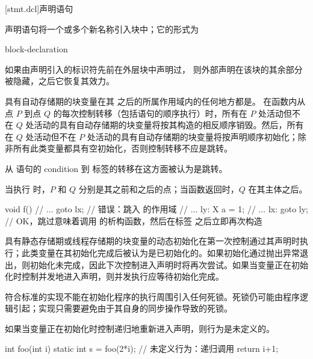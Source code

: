 [stmt.dcl]{声明语句}%

\pnum
声明语句将一个或多个新名称引入块中；它的形式为
\begin{bnf}
\br
    block-declaration
\end{bnf}
\begin{note}
如果由声明引入的标识符先前在外层块中声明过，
%
%
%
则外部声明在该块的其余部分被隐藏，之后它恢复其效力。
\end{note}

\pnum
{}%
%
%
具有自动存储期的块变量在其  之后的所属作用域内的任何地方都是。
%
%
在函数内从点 $P$ 到点 $Q$ 的每次控制转移（包括语句的顺序执行）时，所有在 $P$ 处活动但不在 $Q$ 处活动的具有自动存储期的块变量将按其构造的相反顺序销毁。然后，所有在 $Q$ 处活动但不在 $P$ 处活动的具有自动存储期的块变量将按声明顺序初始化；除非所有此类变量都具有空初始化，否则控制转移不应是跳转。
\begin{footnote}
从  语句的 condition 到  标签的转移在这方面被认为是跳转。
\end{footnote}
当执行  时，$P$ 和 $Q$ 分别是其之前和之后的点；当函数返回时，$Q$ 在其主体之后。
\begin{example}
\begin{codeblock}
void f() {
  // ...
  goto lx;          // 错误：跳入  的作用域
  // ...
ly:
  X a = 1;
  // ...
lx:
  goto ly;          // OK，跳过意味着调用  的析构函数，然后在标签  之后立即再次构造
}
\end{codeblock}
\end{example}

\pnum
{}%
%
%
%
具有静态存储期或线程存储期的块变量的动态初始化在第一次控制通过其声明时执行；此类变量在其初始化完成后被认为是已初始化的。如果初始化通过抛出异常退出，则初始化未完成，因此下次控制进入声明时将再次尝试。如果当变量正在初始化时控制并发地进入声明，则并发执行应等待初始化完成。
\begin{note}
符合标准的实现不能在初始化程序的执行周围引入任何死锁。死锁仍可能由程序逻辑引起；实现只需要避免由于其自身的同步操作导致的死锁。
\end{note}
如果当变量正在初始化时控制递归地重新进入声明，则行为是未定义的。
\begin{example}
\begin{codeblock}
int foo(int i) {
  static int s = foo(2*i);      // 未定义行为：递归调用
  return i+1;
}
\end{codeblock}
\end{example}

